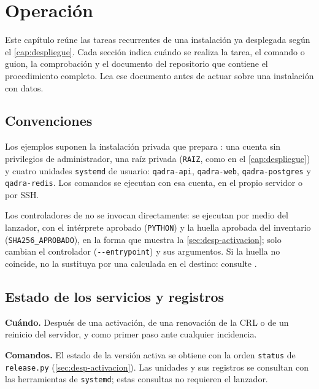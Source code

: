 \chapter{Operación}\label{cap:operacion}

Este capítulo reúne las tareas recurrentes de una instalación ya desplegada
según el \cref{cap:despliegue}. Cada sección indica cuándo se realiza la tarea,
el comando o guion, la comprobación y el documento del repositorio que contiene
el procedimiento completo. Lea ese documento antes de actuar sobre una instalación con datos.

\section{Convenciones}\label{sec:op-convenciones}

Los ejemplos suponen la instalación privada que prepara
: una cuenta sin privilegios de administrador, una
raíz privada (\texttt{RAIZ}, como en el \cref{cap:despliegue}) y cuatro unidades \texttt{systemd}
de usuario: \texttt{qadra-api}, \texttt{qadra-web}, \texttt{qadra-postgres} y
\texttt{qadra-redis}. Los comandos se ejecutan con esa cuenta, en el propio
servidor o por SSH.

Los controladores de  no se invocan directamente: se
ejecutan por medio del lanzador, con el intérprete aprobado
(\texttt{PYTHON}) y la huella aprobada del inventario
(\texttt{SHA256\_APROBADO}), en la forma que muestra la
\cref{sec:desp-activacion}; solo cambian el controlador
(\mbox{\texttt{-{}-entrypoint}}) y sus argumentos. Si la huella no coincide,
no la sustituya por una calculada en el destino: consulte
.

\section{Estado de los servicios y registros}\label{sec:op-estado}

\textbf{Cuándo.} Después de una activación, de una renovación de la CRL o de un
reinicio del servidor, y como primer paso ante cualquier incidencia.

\textbf{Comandos.} El estado de la versión activa se obtiene con la orden
\texttt{status} de \texttt{release.py} (\cref{sec:desp-activacion}). Las unidades y sus registros se consultan con
las herramientas de \texttt{systemd}; estas consultas no requieren el lanzador.

